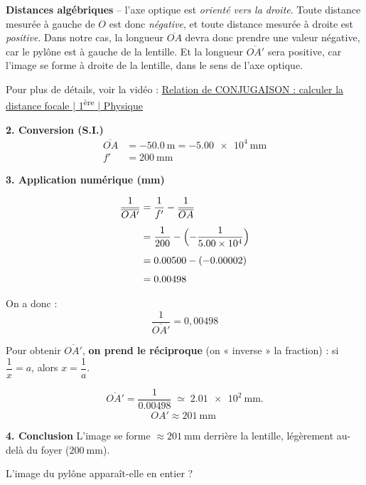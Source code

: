 \documentclass[answers]{exam}
\begin{document}
\begin{questions}
\begin{questions}
\begin{solution}
\medskip
{\color{red}
\textbf{Distances algébriques} – l’axe optique est \emph{orienté vers la droite}.  
Toute distance mesurée à gauche de \(O\) est donc \emph{négative}, et toute distance
mesurée à droite est \emph{positive}. Dans notre cas, la longueur \(\overline{OA}\) devra donc prendre une valeur négative, car le pylône est à gauche de la lentille. Et la longueur \(\overline{OA'}\) sera positive, car l’image se forme à droite de la lentille, dans le sens de l’axe optique.  
}
\medskip

Pour plus de détails, voir la vidéo : \href{https://www.youtube.com/watch?v=rBXHw1L-6y0}{Relation de CONJUGAISON : calculer la distance focale | 1\textsuperscript{ère} | Physique}

\medskip
\textbf{2. Conversion (S.I.)}  
\[
\begin{aligned}
  \overline{OA} &= \SI{-50.0}{\meter}
                 = \SI{-5.00e4}{\milli\metre} \\[4pt]
  f'            &= \SI{200}{\milli\metre}
\end{aligned}
\]

\textbf{3. Application numérique (mm)}  

\begin{align*}
  \frac{1}{\overline{OA'}} 
    &= \frac{1}{f'} - \frac{1}{\overline{OA}} \\[4pt]
    &= \frac{1}{200} - \Bigl(-\frac{1}{5.00\times10^{4}}\Bigr) \\[4pt]
    &= 0.00500 - (-0.00002) \\[4pt]
    &= 0.00498 
\end{align*}

\vspace{0.6em}
On a donc :  
\[
  \boxed{\displaystyle \frac{1}{\overline{OA'}} = 0{,}00498}
\]

\vspace{0.6em}
Pour obtenir \(\overline{OA'}\), \textbf{on prend le réciproque} (on « inverse » la
fraction) : si \(\dfrac{1}{x}=a\), alors \(x=\dfrac{1}{a}\).

\[
  \overline{OA'} = \frac{1}{0.00498}
  \;\simeq\; \SI{2.01e2}{\milli\metre}.
  \]
\[
  \boxed{\overline{OA'} \approx \SI{201}{\milli\metre}\;}
\]

\textbf{4. Conclusion}  
L’image se forme \(\approx\!\SI{201}{\milli\metre}\) derrière la lentille,
légèrement au-delà du foyer (\(\SI{200}{\milli\metre}\)).


\end{solution}

\question[C.6.3] L’image du pylône apparaît-elle en entier ?


\end{questions}
\end{questions}
\end{document}
